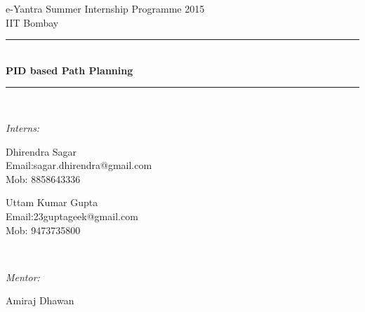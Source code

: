 \documentclass[report]{res}
\begin{document}
	
	\begin{titlepage}
		
		\newcommand{\HRule}{\rule{\linewidth}{0.5mm}} %
		
		\center %
		
		{\LARGE e-Yantra Summer Internship Programme 2015}\\[1.5cm] %
		{\Large IIT Bombay}\\[1cm] %
		
		
		
		\HRule \\[0.4cm]
		{ \huge \bfseries PID based Path Planning }\\[0.4cm] %
		\HRule \\[4cm]
		
		
		\begin{minipage}{0.4\textwidth}
			\begin{flushleft} \large
				\emph{Interns: }\\
			\end{flushleft}
			
			\begin{flushleft}
				{\large Dhirendra Sagar} \\  Email:sagar.dhirendra@gmail.com \\ Mob: 8858643336
			\end{flushleft}
			
			\begin{flushleft}
				{\large Uttam Kumar Gupta} \\  Email:23guptageek@gmail.com	\\Mob: 9473735800 \\
			\end{flushleft}
		\end{minipage}
		~
		\begin{minipage}{0.4\textwidth}
			\begin{flushright} \large
				\emph{Mentor:} \\
			\end{flushright}
			\begin{flushright}
				{\large Amiraj Dhawan\\} 
			\end{flushright}
		\end{minipage}\\[2cm]
		

\end{titlepage}
\end{document}
